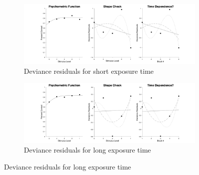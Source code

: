 \documentclass{article}
\begin{document}
\begin{figure}[!hb]
    \begin{subfigure}{\textwidth}
        \centering
        \includegraphics[width = \linewidth]{Thesis/plots/gof/cutNo/cutNo_da_short_deviance.png}
        \caption{Deviance residuals for short exposure time}
    \end{subfigure}
    \begin{subfigure}{\textwidth}
        \centering
        \includegraphics[width = \linewidth]{Thesis/plots/gof/cutNo/cutNo_da_long_deviance.png}
        \caption{Deviance residuals for long exposure time}
    \end{subfigure}
\end{figure}

\clearpage
\end{document}
